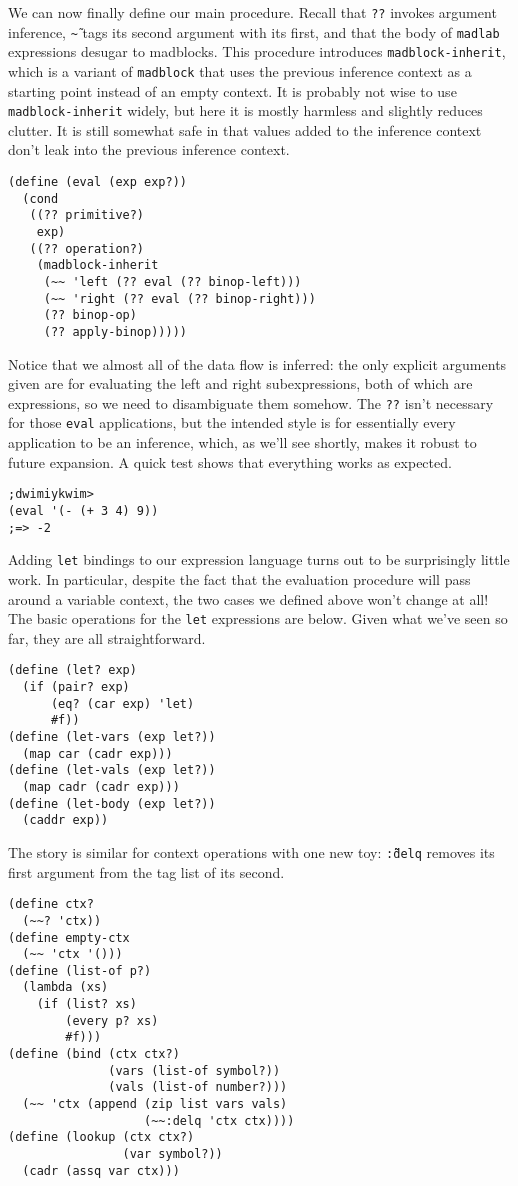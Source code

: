 \documentclass[11pt]{article}
\begin{document}
We can now finally define our main procedure.
Recall that \texttt{??} invokes argument inference,
\texttt{\~\~} tags its second argument with its first,
and that the body of \texttt{madlab} expressions
desugar to madblocks.
This procedure introduces \texttt{madblock-inherit},
which is a variant of \texttt{madblock} that
uses the previous inference context as a starting point
instead of an empty context.
It is probably not wise to use \texttt{madblock-inherit} widely,
but here it is mostly harmless and slightly reduces clutter.
It is still somewhat safe in that values added to the inference context
don't leak into the previous inference context.
\begin{Verbatim}
(define (eval (exp exp?))
  (cond
   ((?? primitive?)
    exp)
   ((?? operation?)
    (madblock-inherit
     (~~ 'left (?? eval (?? binop-left)))
     (~~ 'right (?? eval (?? binop-right)))
     (?? binop-op)
     (?? apply-binop)))))
\end{Verbatim}
Notice that we almost all of the data flow is inferred:
the only explicit arguments given are for evaluating
the left and right subexpressions,
both of which are expressions, so we need to disambiguate them somehow.
The \texttt{??} isn't necessary for those \texttt{eval} applications,
but the intended style is for essentially every application
to be an inference,
which, as we'll see shortly, makes it robust to future expansion.
A quick test shows that everything works as expected.
\begin{Verbatim}
;dwimiykwim>
(eval '(- (+ 3 4) 9))
;=> -2
\end{Verbatim}

Adding \texttt{let} bindings to our expression language
turns out to be surprisingly little work.
In particular,
despite the fact that the evaluation procedure
will pass around a variable context,
the two cases we defined above won't change at all!
The basic operations for the \texttt{let} expressions are below.
Given what we've seen so far, they are all straightforward.
\begin{Verbatim}
(define (let? exp)
  (if (pair? exp)
      (eq? (car exp) 'let)
      #f))
(define (let-vars (exp let?))
  (map car (cadr exp)))
(define (let-vals (exp let?))
  (map cadr (cadr exp)))
(define (let-body (exp let?))
  (caddr exp))
\end{Verbatim}
The story is similar for context operations with one new toy:
\texttt{\~\~:delq} removes its first argument from the tag list of its second.
\begin{Verbatim}
(define ctx?
  (~~? 'ctx))
(define empty-ctx
  (~~ 'ctx '()))
(define (list-of p?)
  (lambda (xs)
    (if (list? xs)
        (every p? xs)
        #f)))
(define (bind (ctx ctx?)
              (vars (list-of symbol?))
              (vals (list-of number?)))
  (~~ 'ctx (append (zip list vars vals)
                   (~~:delq 'ctx ctx))))
(define (lookup (ctx ctx?)
                (var symbol?))
  (cadr (assq var ctx)))
\end{Verbatim}
\end{document}
